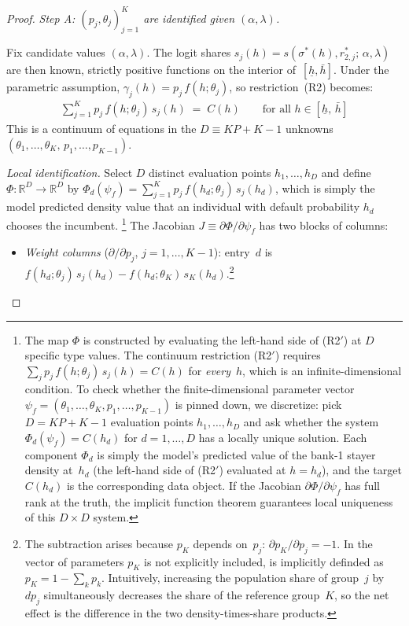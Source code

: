 \documentclass[12pt]{article}
\theoremstyle{plain}
\theoremstyle{plain}
\theoremstyle{definition}
\theoremstyle{remark}
\begin{document}
\begin{proof}
\medskip\noindent
\emph{Step A: $(p_j,\theta_j)_{j=1}^K$ are identified given $(\alpha,\lambda)$.}

Fix candidate values $(\alpha,\lambda)$.  The logit shares $s_j(h) = s(\sigma^*(h), r_{2,j}^*;\,\alpha,\lambda)$ are then known, strictly positive functions on the interior of~$[\underline{h},\bar{h}]$.  Under the parametric assumption, $\gamma_j(h) = p_j\,f(h;\theta_j)$, so restriction~(R2) becomes:
\begin{align}\tag{R2$'$}
    \sum_{j=1}^K p_j\, f(h;\theta_j)\, s_j(h) \;=\; C(h) \qquad \text{for all } h \in [\underline{h},\,\bar{h}]
\end{align}
This is a continuum of equations in the $D \equiv KP + K - 1$ unknowns $(\theta_1,\ldots,\theta_K,\,p_1,\ldots,p_{K-1})$.

\emph{Local identification.}  Select $D$ distinct evaluation points $h_1,\ldots,h_D$ and define $\Phi: \mathbb{R}^D \to \mathbb{R}^D$ by $\Phi_d(\psi_f) = \sum_{j=1}^K p_j\,f(h_d;\theta_j)\,s_j(h_d)$, which is simply the model predicted density value that an individual with default probability $h_d$ chooses the incumbent. \footnote{The map $\Phi$ is constructed by evaluating the left-hand side of (R2$'$) at $D$ specific type values.  The continuum restriction (R2$'$) requires $\sum_j p_j\, f(h;\theta_j)\, s_j(h) = C(h)$ for \emph{every}~$h$, which is an infinite-dimensional condition.  To check whether the finite-dimensional parameter vector $\psi_f = (\theta_1,\ldots,\theta_K, p_1,\ldots,p_{K-1})$ is pinned down, we discretize: pick $D = KP + K - 1$ evaluation points $h_1,\ldots,h_D$ and ask whether the system $\Phi_d(\psi_f) = C(h_d)$ for $d = 1,\ldots,D$ has a locally unique solution.  Each component $\Phi_d$ is simply the model's predicted value of the bank-1 stayer density at~$h_d$ (the left-hand side of (R2$'$) evaluated at $h = h_d$), and the target $C(h_d)$ is the corresponding data object.  If the Jacobian $\partial\Phi/\partial\psi_f$ has full rank at the truth, the implicit function theorem guarantees local uniqueness of this $D \times D$ system.  }  The Jacobian $J \equiv \partial\Phi/\partial\psi_f$ has two blocks of columns:
\begin{itemize}
    \item \emph{Weight columns} ($\partial/\partial p_j$, $j = 1,\ldots,K\!-\!1$): entry~$d$ is $f(h_d;\theta_j)\,s_j(h_d) - f(h_d;\theta_K)\,s_K(h_d)$.\footnote{The subtraction arises because $p_K$ depends on~$p_j$: $\partial p_K/\partial p_j = -1$. In the vector of parameters $p_K$ is not explicitly included, is implicitly definded as $p_K = 1- \sum_k p_k$. Intuitively, increasing the population share of group~$j$ by $dp_j$ simultaneously decreases the share of the reference group~$K$, so the net effect is the difference in the two density-times-share products.}

\end{itemize}
\end{proof}
\end{document}
